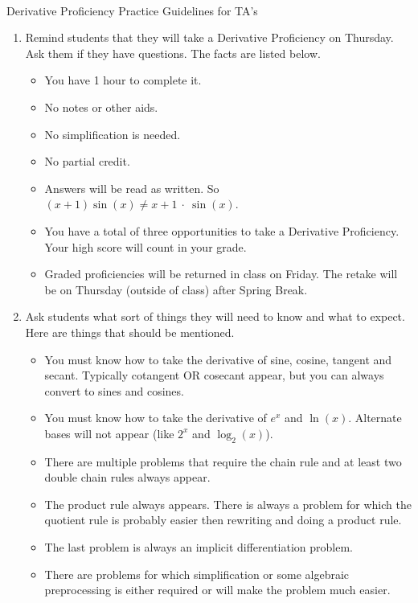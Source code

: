 \documentclass[11pt,fleqn]{article}
\begin{document}
\renewcommand{\headrulewidth}{0pt}
\newcommand{\blank}[1]{\rule{#1}{0.75pt}}
\newcommand{\bc}{\begin{center}}
\newcommand{\ec}{\end{center}}
\renewcommand{\d}{\displaystyle}

\vspace*{-0.7in}

\begin{center}
  \large
  \\
  Derivative Proficiency Practice Guidelines for TA's
\end{center}

\begin{enumerate}
\item Remind students that they will take a Derivative Proficiency on Thursday. Ask them if they have questions. The facts are listed below.
	\begin{itemize}
	\item You have 1 hour to complete it.
	\item No notes or other aids.
	\item No simplification is needed.
	\item No partial credit. 
	\item Answers will be read as written. So $(x+1)\sin(x) \not = x+1 \: \cdot \: \sin(x)$.
	\item You have a total of three opportunities to take a Derivative Proficiency. Your high score will count in your grade.
	\item Graded proficiencies will be returned in class on Friday. The retake will be on Thursday (outside of class) after Spring Break.
	\end{itemize} 
\item Ask students what sort of things they will need to know and what to expect. Here are things that should be mentioned.
	\begin{itemize}
	\item You must know how to take the derivative of sine, cosine, tangent and secant. Typically cotangent OR cosecant appear, but you can always convert to sines and cosines.
	\item You must know how to take the derivative of $e^x$ and $\ln(x)$. Alternate bases will not appear (like $2^x$ and $\log_2(x)$).
	\item There are multiple problems that require the chain rule and at least two double chain rules always appear.
	\item The product rule always appears. There is always a problem for which the quotient rule is probably easier then rewriting and doing a product rule.
	\item The last problem is always an implicit differentiation problem.
	\item There are problems for which simplification or some algebraic preprocessing is either required or will make the problem much easier. 
	\end{itemize}
\end{enumerate}
\end{document}
